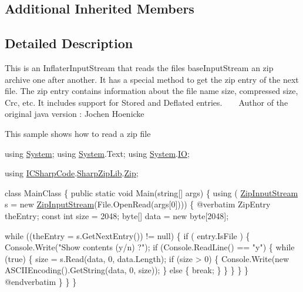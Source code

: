 \subsection*{Additional Inherited Members}


\subsection{Detailed Description}
This is an Inflater\+Input\+Stream that reads the files base\+Input\+Stream an zip archive one after another. It has a special method to get the zip entry of the next file. The zip entry contains information about the file name size, compressed size, Crc, etc. It includes support for Stored and Deflated entries. ~\newline
 ~\newline
Author of the original java version \+: Jochen Hoenicke 

This sample shows how to read a zip file 
\begin{DoxyCode}
\textcolor{keyword}{using} \hyperlink{namespace_system}{System};
\textcolor{keyword}{using} \hyperlink{namespace_system}{System}.Text;
\textcolor{keyword}{using} \hyperlink{namespace_system}{System}.\hyperlink{namespace_system_1_1_i_o}{IO};

\textcolor{keyword}{using} \hyperlink{namespace_i_c_sharp_code}{ICSharpCode}.\hyperlink{namespace_i_c_sharp_code_1_1_sharp_zip_lib}{SharpZipLib}.\hyperlink{namespace_i_c_sharp_code_1_1_sharp_zip_lib_1_1_zip}{Zip};

\textcolor{keyword}{class }MainClass
\{
    \textcolor{keyword}{public} \textcolor{keyword}{static} \textcolor{keywordtype}{void} Main(\textcolor{keywordtype}{string}[] args)
    \{
        \textcolor{keyword}{using} ( \hyperlink{class_i_c_sharp_code_1_1_sharp_zip_lib_1_1_zip_1_1_zip_input_stream_a453c9cf3787f5fa5210c415e3f1d8ae4}{ZipInputStream} s = \textcolor{keyword}{new} \hyperlink{class_i_c_sharp_code_1_1_sharp_zip_lib_1_1_zip_1_1_zip_input_stream_a453c9cf3787f5fa5210c415e3f1d8ae4}{ZipInputStream}(File.OpenRead(args[0]))) 
      \{
@verbatim
ZipEntry theEntry;
\textcolor{keyword}{const} \textcolor{keywordtype}{int} size = 2048;
byte[] data = \textcolor{keyword}{new} byte[2048];

\textcolor{keywordflow}{while} ((theEntry = s.GetNextEntry()) != null) \{
    \textcolor{keywordflow}{if} ( entry.IsFile ) \{
        Console.Write(\textcolor{stringliteral}{"Show contents (y/n) ?"});
        \textcolor{keywordflow}{if} (Console.ReadLine() == \textcolor{stringliteral}{"y"}) \{
            \textcolor{keywordflow}{while} (\textcolor{keyword}{true}) \{
                size = s.Read(data, 0, data.Length);
                \textcolor{keywordflow}{if} (size > 0) \{
                    Console.Write(\textcolor{keyword}{new} ASCIIEncoding().GetString(data, 0, size));
                \} \textcolor{keywordflow}{else} \{
                    \textcolor{keywordflow}{break};
                \}
            \}
        \}
    \}
\}
\textcolor{keyword}{@end}verbatim
        \}
    \}
\}
\end{DoxyCode}
 

